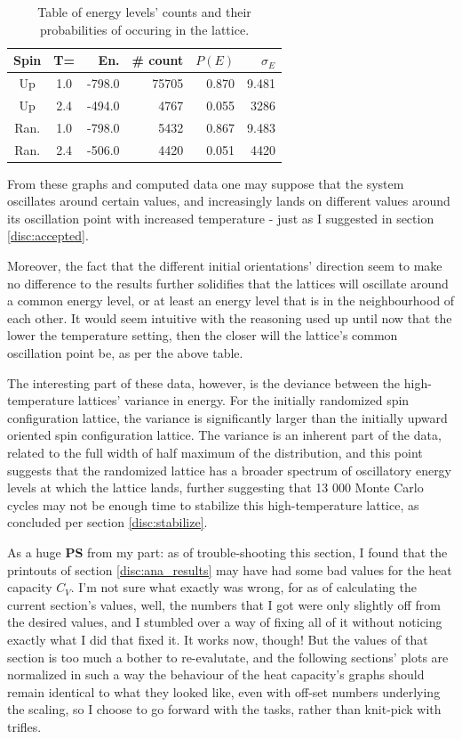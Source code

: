 \documentclass[11pt,a4paper,notitlepage,twocolumn]{article}
\begin{document}
\begin{table}
[H]
\begin{tabular}{|c|c|r|r|r|r|}\hline
	Spin & T= & En. & \# count & $P(E)$ & $\sigma_E$ \\ \hline
	Up & 1.0 & -798.0 & 75705 & 0.870 & 9.481\\ \hline 
	Up & 2.4 & -494.0 & 4767 & 0.055 & 3286 \\ \hline
	Ran. & 1.0 & -798.0 & 5432 & 0.867 & 9.483 \\ \hline
	Ran. & 2.4 & -506.0 & 4420 & 0.051 & 4420\\ \hline
\end{tabular}
\caption{Table of energy levels' counts and their probabilities of occuring in the lattice.}
\end{table}
From these graphs and computed data one may suppose that the system oscillates around certain values, and increasingly lands on different values around its oscillation point with increased temperature - just as I suggested in section \ref{disc:accepted}.

Moreover, the fact that the different initial orientations' direction seem to make no difference to the results further solidifies that the lattices will oscillate around a common energy level, or at least an energy level that is in the neighbourhood of each other. It would seem intuitive with the reasoning used up until now that the lower the temperature setting, then the closer will the lattice's common oscillation point be, as per the above table.

The interesting part of these data, however, is the deviance between the high-temperature lattices' variance in energy. For the initially randomized spin configuration lattice, the variance is significantly larger than the initially upward oriented spin configuration lattice. The variance is an inherent part of the data, related to the full width of half maximum of the distribution, and this point suggests that the randomized lattice has a broader spectrum of oscillatory energy levels at which the lattice lands, further suggesting that 13 000 Monte Carlo cycles may not be enough time to stabilize this high-temperature lattice, as concluded per section \ref{disc:stabilize}.

As a huge \textbf{PS} from my part: as of trouble-shooting this section, I found that the printouts of section  \ref{disc:ana_results} may have had some bad values for the heat capacity $C_V$. I'm not sure what exactly was wrong, for as of calculating the current section's values, well, the numbers that I got were only slightly off from the desired values, and I stumbled over a way of fixing all of it without noticing exactly what I did that fixed it. It works now, though! But the values of that section is too much a bother to re-evalutate, and the following sections' plots are normalized in such a way the behaviour of the heat capacity's graphs should remain identical to what they looked like, even with off-set numbers underlying the scaling, so I choose to go forward with the tasks, rather than knit-pick with trifles.
\end{document}
